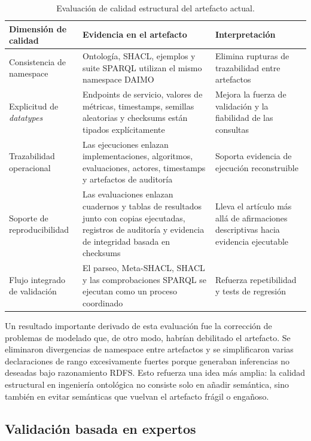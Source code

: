\documentclass[11pt,a4paper]{article}
\begin{document}
\begin{table}[t]
\caption{Evaluación de calidad estructural del artefacto actual.}
\label{tab:quality}
\centering
\small
\begin{tabularx}{\textwidth}{@{}L{3cm}XL{4cm}@{}}
\toprule
\textbf{Dimensión de calidad} & \textbf{Evidencia en el artefacto} & \textbf{Interpretación} \\
\midrule
Consistencia de namespace & Ontología, SHACL, ejemplos y suite SPARQL utilizan el mismo namespace DAIMO & Elimina rupturas de trazabilidad entre artefactos \\[0.4em]
Explicitud de \emph{datatypes} & Endpoints de servicio, valores de métricas, timestamps, semillas aleatorias y checksums están tipados explícitamente & Mejora la fuerza de validación y la fiabilidad de las consultas \\[0.4em]
Trazabilidad operacional & Las ejecuciones enlazan implementaciones, algoritmos, evaluaciones, actores, timestamps y artefactos de auditoría & Soporta evidencia de ejecución reconstruible \\[0.4em]
Soporte de reproducibilidad & Las evaluaciones enlazan cuadernos y tablas de resultados junto con copias ejecutadas, registros de auditoría y evidencia de integridad basada en checksums & Lleva el artículo más allá de afirmaciones descriptivas hacia evidencia ejecutable \\[0.4em]
Flujo integrado de validación & El parseo, Meta-SHACL, SHACL y las comprobaciones SPARQL se ejecutan como un proceso coordinado & Refuerza repetibilidad y tests de regresión \\
\bottomrule
\end{tabularx}
\end{table}

Un resultado importante derivado de esta evaluación fue la corrección de problemas de modelado que, de otro modo, habrían debilitado el artefacto. Se eliminaron divergencias de namespace entre artefactos y se simplificaron varias declaraciones de rango excesivamente fuertes porque generaban inferencias no deseadas bajo razonamiento RDFS. Esto refuerza una idea más amplia: la calidad estructural en ingeniería ontológica no consiste solo en añadir semántica, sino también en evitar semánticas que vuelvan el artefacto frágil o engañoso.

\subsection{Validación basada en expertos}
\end{document}
